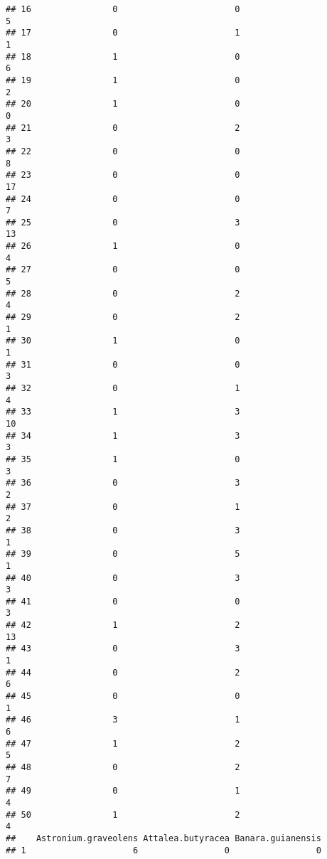 \documentclass[
]{article}
\begin{document}
\begin{verbatim}
## 16                0                       0                        5
## 17                0                       1                        1
## 18                1                       0                        6
## 19                1                       0                        2
## 20                1                       0                        0
## 21                0                       2                        3
## 22                0                       0                        8
## 23                0                       0                       17
## 24                0                       0                        7
## 25                0                       3                       13
## 26                1                       0                        4
## 27                0                       0                        5
## 28                0                       2                        4
## 29                0                       2                        1
## 30                1                       0                        1
## 31                0                       0                        3
## 32                0                       1                        4
## 33                1                       3                       10
## 34                1                       3                        3
## 35                1                       0                        3
## 36                0                       3                        2
## 37                0                       1                        2
## 38                0                       3                        1
## 39                0                       5                        1
## 40                0                       3                        3
## 41                0                       0                        3
## 42                1                       2                       13
## 43                0                       3                        1
## 44                0                       2                        6
## 45                0                       0                        1
## 46                3                       1                        6
## 47                1                       2                        5
## 48                0                       2                        7
## 49                0                       1                        4
## 50                1                       2                        4
##    Astronium.graveolens Attalea.butyracea Banara.guianensis
## 1                     6                 0                 0

\end{verbatim}
\end{document}
